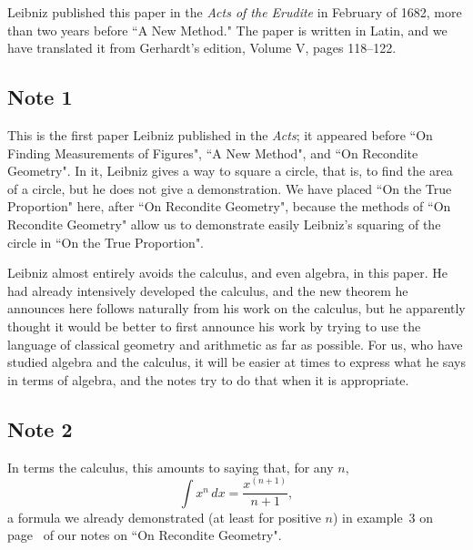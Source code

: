 \documentclass[polutonikogreek,english,twoside,openright]{article}
\begin{document}
Leibniz published this paper in the {\em Acts of the Erudite} in
February of 1682, more than two years before ``A New Method."  The
paper is written in Latin, and we have translated it from Gerhardt's
edition, Volume V, pages 118--122.

\subsection*{Note 1}
\label{ctp1}
This is the first paper Leibniz published in the {\em Acts}; it
appeared before ``On Finding Measurements of Figures", ``A New
Method", and ``On Recondite Geometry".  In it, Leibniz gives a way to
square a circle, that is, to find the area of a circle, but he does
not give a demonstration.  We have placed ``On the True Proportion"
here, after ``On Recondite Geometry", because the methods of ``On
Recondite Geometry" allow us to demonstrate easily Leibniz's squaring
of the circle in ``On the True Proportion".

Leibniz almost entirely avoids the calculus, and even algebra, in this
paper.  He had already intensively developed the calculus, and the new
theorem he announces here follows naturally from his work on the
calculus, but he apparently thought it would be better to first
announce his work by trying to use the language of classical geometry
and arithmetic as far as possible.  For us, who have studied algebra
and the calculus, it will be easier at times to express what he says
in terms of algebra, and the notes try to do that when it is
appropriate.

\subsection*{Note 2}
\label{ctp2}

In terms the calculus, this amounts to saying that, for any $n$,
$$\int\! x^n\,dx = \frac{x^{(n+1)}}{n+1},$$
a formula we already demonstrated (at least for positive $n$) in
example~3 on page~\pageref{intxn} of our notes on ``On Recondite
Geometry".
\end{document}
